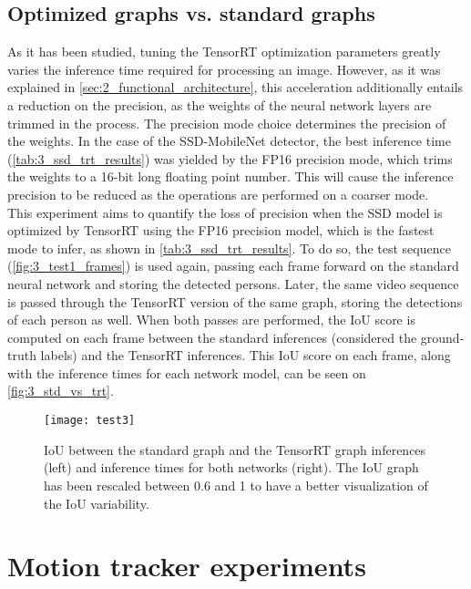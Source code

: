 \subsection{Optimized graphs vs. standard graphs}

\label{sec:3_test3}
As it has been studied, tuning the TensorRT optimization parameters greatly varies the inference time required for processing an image. However, as it was explained in \autoref{sec:2_functional_architecture}, this acceleration additionally entails a reduction on the precision, as the weights of the neural network layers are trimmed in the process. The precision mode choice determines the precision of the weights. In the case of the SSD-MobileNet detector, the best inference time (\autoref{tab:3_ssd_trt_results}) was yielded by the FP16 precision mode, which trims the weights to a 16-bit long floating point number. This will cause the inference precision to be reduced as the operations are performed on a coarser mode.\\

This experiment aims to quantify the loss of precision when the SSD model is optimized by TensorRT using the FP16 precision model, which is the fastest mode to infer, as shown in \autoref{tab:3_ssd_trt_results}. To do so, the test sequence (\autoref{fig:3_test1_frames}) is used again, passing each frame forward on the standard neural network and storing the detected persons. Later, the same video sequence is passed through the TensorRT version of the same graph, storing the detections of each person as well. When both passes are performed, the IoU score is computed on each frame between the standard inferences (considered the ground-truth labels) and the TensorRT inferences. This IoU score on each frame, along with the inference times for each network model, can be seen on \autoref{fig:3_std_vs_trt}.

\begin{figure}[h]
	\centering
	\texttt{[image: test3]}
	\caption{IoU between the standard graph and the TensorRT graph inferences (left) and inference times for both networks (right). The IoU graph has been rescaled between 0.6 and 1 to have a better visualization of the IoU variability.}
	\label{fig:3_std_vs_trt}
\end{figure}






\section{Motion tracker experiments}

